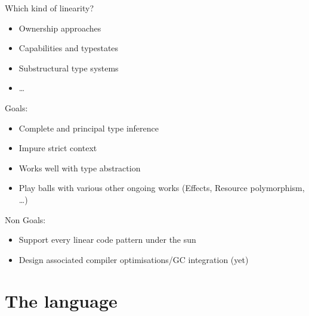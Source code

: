\documentclass[xcolor=svgnames,11pt]{beamer}
\begin{document}
\begin{frame}
  Which kind of linearity?
  \begin{itemize}
  \item \alert<2>{Ownership approaches}
    
  \item \alert<3>{Capabilities and typestates}
    
  \item \alert<4,6>{Substructural type systems}
    
  \item \alert<5>{\dots}
    
  \end{itemize}
\end{frame}

\begin{frame}
  Goals:
  \begin{itemize}
  \item Complete and principal type inference
  \item Impure strict context
  \item Works well with type abstraction
  \item Play balls with various other ongoing works (Effects, Resource polymorphism, \dots)
  \end{itemize}

  \pause
  Non Goals:
  \begin{itemize}
  \item Support every linear code pattern under the sun
  \item Design associated compiler optimisations/GC integration (yet)
  \end{itemize}
\end{frame}


\section{The \lang language}
\end{document}
